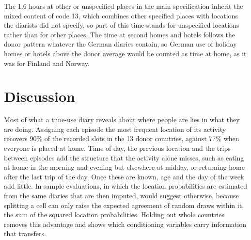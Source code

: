 \documentclass[a4paper]{article}
\begin{document}
The 1.6 hours at other or unspecified places in the main specification inherit the mixed content of code 13, which combines other specified places with locations the diarists did not specify, so part of this time stands for unspecified locations rather than for other places. The time at second homes and hotels follows the donor pattern whatever the German diaries contain, so German use of holiday homes or hotels above the donor average would be counted as time at home, as it was for Finland and Norway.

\section{Discussion}
\label{sec:discussion}

Most of what a time-use diary reveals about where people are lies in what they are doing. Assigning each episode the most frequent location of its activity recovers 90\% of the recorded slots in the 13 donor countries, against 77\% when everyone is placed at home. Time of day, the previous location and the trips between episodes add the structure that the activity alone misses, such as eating at home in the morning and evening but elsewhere at midday, or returning home after the last trip of the day. Once these are known, age and the day of the week add little. In-sample evaluations, in which the location probabilities are estimated from the same diaries that are then imputed, would suggest otherwise, because splitting a cell can only raise the expected agreement of random draws within it, the sum of the squared location probabilities. Holding out whole countries removes this advantage and shows which conditioning variables carry information that transfers.
\end{document}
